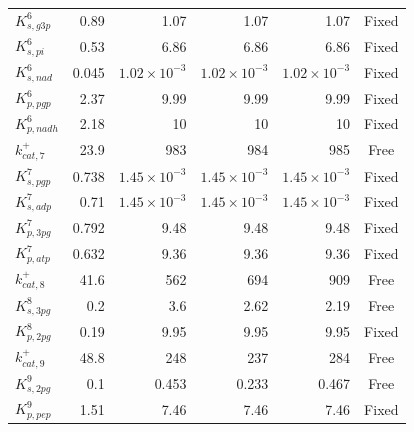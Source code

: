 \begin{table}
\begin{tabular}{lrrrrc}
$K_{s,g3p}^{6}$ & 0.89 & 1.07 & 1.07 & 1.07 & Fixed \\
$K_{s,pi}^{6}$ & 0.53 & 6.86 & 6.86 & 6.86 & Fixed \\
$K_{s,nad}^{6}$ & 0.045 & $1.02 \times 10^{-3}$ & $1.02 \times 10^{-3}$ & $1.02 \times 10^{-3}$ & Fixed \\
$K_{p,pgp}^{6}$ & 2.37 & 9.99 & 9.99 & 9.99 & Fixed \\
$K_{p,nadh}^{6}$ & 2.18 & 10 & 10 & 10 & Fixed \\
$k^{+}_{cat,7}$ & 23.9 & 983 & 984 & 985 & Free \\
$K_{s,pgp}^{7}$ & 0.738 & $1.45 \times 10^{-3}$ & $1.45 \times 10^{-3}$ & $1.45 \times 10^{-3}$ & Fixed \\
$K_{s,adp}^{7}$ & 0.71 & $1.45 \times 10^{-3}$ & $1.45 \times 10^{-3}$ & $1.45 \times 10^{-3}$ & Fixed \\
$K_{p,3pg}^{7}$ & 0.792 & 9.48 & 9.48 & 9.48 & Fixed \\
$K_{p,atp}^{7}$ & 0.632 & 9.36 & 9.36 & 9.36 & Fixed \\
$k^{+}_{cat,8}$ & 41.6 & 562 & 694 & 909 & Free \\
$K_{s,3pg}^{8}$ & 0.2 & 3.6 & 2.62 & 2.19 & Free \\
$K_{p,2pg}^{8}$ & 0.19 & 9.95 & 9.95 & 9.95 & Fixed \\
$k^{+}_{cat,9}$ & 48.8 & 248 & 237 & 284 & Free \\
$K_{s,2pg}^{9}$ & 0.1 & 0.453 & 0.233 & 0.467 & Free \\
$K_{p,pep}^{9}$ & 1.51 & 7.46 & 7.46 & 7.46 & Fixed \\
\bottomrule
\end{tabular}
\end{table}
